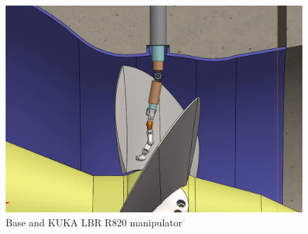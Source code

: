 
\begin{figure}[h!]
\centering
	\includegraphics[width=\columnwidth]{figs/estudo/solid/Base_Ambiente3d_Operacao.PNG} 
	\caption{Base and KUKA LBR R820 manipulator}
	\label{fig::base_ambiente3d_recolhida}
\end{figure}

%




